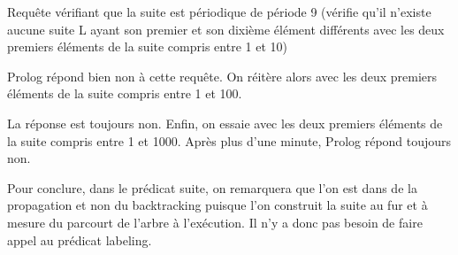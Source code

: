 \documentclass[11pt]{article} %
\begin{document}
Requête vérifiant que la suite est périodique de période 9
(vérifie qu'il n'existe aucune suite L ayant son premier et son dixième élément différents avec les deux premiers
éléments de la suite compris entre 1 et 10)

Prolog répond bien non à cette requête. On réitère alors avec les deux premiers éléments de la suite compris
entre 1 et 100.

La réponse est toujours non.
Enfin, on essaie avec les deux premiers éléments de la suite compris entre 1 et 1000.
Après plus d'une minute, Prolog répond toujours non.

Pour conclure, dans le prédicat suite, on remarquera que l'on est dans de la propagation et non du backtracking
puisque l'on construit la suite au fur et à mesure du parcourt de l'arbre à l'exécution.
Il n'y a donc pas besoin de faire appel au prédicat labeling.
\end{document}
